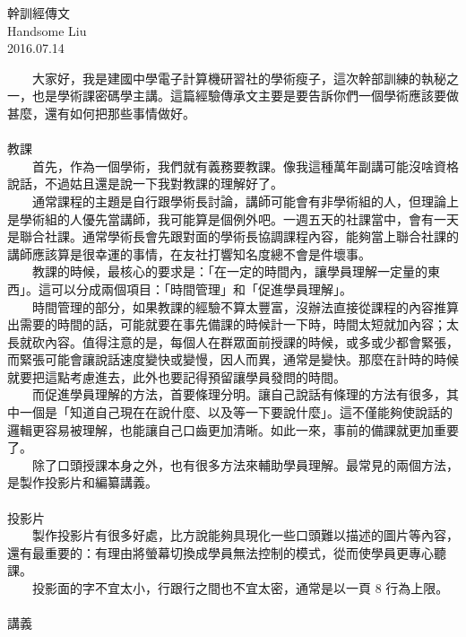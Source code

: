 \documentclass{report}
\begin{document}
\pagestyle{plain}
\fontsize{12pt}{20pt}\selectfont
\begin{center}
	\Huge{幹訓經傳文}\\ 
	\huge{Handsome Liu}\\ 
	\huge{2016.07.14}\\ 
\end{center}
	
　　大家好，我是建國中學電子計算機研習社的學術瘦子，這次幹部訓練的執秘之一，也是學術課密碼學主講。這篇經驗傳承文主要是要告訴你們一個學術應該要做甚麼，還有如何把那些事情做好。\\
\\{\Large 教課}\\
　　首先，作為一個學術，我們就有義務要教課。像我這種萬年副講可能沒啥資格說話，不過姑且還是說一下我對教課的理解好了。\\
　　通常課程的主題是自行跟學術長討論，講師可能會有非學術組的人，但理論上是學術組的人優先當講師，我可能算是個例外吧。一週五天的社課當中，會有一天是聯合社課。通常學術長會先跟對面的學術長協調課程內容，能夠當上聯合社課的講師應該算是很幸運的事情，在友社打響知名度總不會是件壞事。\\
　　教課的時候，最核心的要求是：「在一定的時間內，讓學員理解一定量的東西」。這可以分成兩個項目：「時間管理」和「促進學員理解」。\\
　　時間管理的部分，如果教課的經驗不算太豐富，沒辦法直接從課程的內容推算出需要的時間的話，可能就要在事先備課的時候計一下時，時間太短就加內容；太長就砍內容。值得注意的是，每個人在群眾面前授課的時候，或多或少都會緊張，而緊張可能會讓說話速度變快或變慢，因人而異，通常是變快。那麼在計時的時候就要把這點考慮進去，此外也要記得預留讓學員發問的時間。\\
　　而促進學員理解的方法，首要條理分明。讓自己說話有條理的方法有很多，其中一個是「知道自己現在在說什麼、以及等一下要說什麼」。這不僅能夠使說話的邏輯更容易被理解，也能讓自己口齒更加清晰。如此一來，事前的備課就更加重要了。\\
　　除了口頭授課本身之外，也有很多方法來輔助學員理解。最常見的兩個方法，是製作投影片和編纂講義。\\
\\{\Large 投影片}\\
　　製作投影片有很多好處，比方說能夠具現化一些口頭難以描述的圖片等內容，還有最重要的：有理由將螢幕切換成學員無法控制的模式，從而使學員更專心聽課。\\
　　投影面的字不宜太小，行跟行之間也不宜太密，通常是以一頁 8 行為上限。\\
\\{\Large 講義}\\
\end{document}
